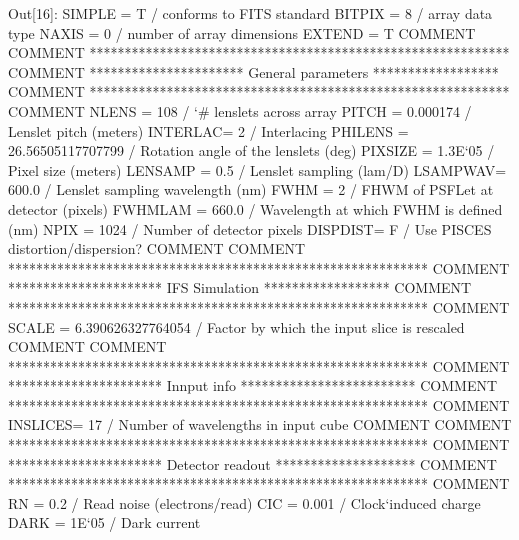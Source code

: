 \documentclass[letterpaper,10pt,english]{sphinxmanual}
\def\PYGZsh{\char`\#}
\def\PYGZhy{\char`\-}
\begin{document}
\begin{OriginalVerbatim}[commandchars=\\\{\}]
\textcolor{nbsphinxout}{Out[16]: }SIMPLE  =                    T / conforms to FITS standard
         BITPIX  =                    8 / array data type
         NAXIS   =                    0 / number of array dimensions
         EXTEND  =                    T
         COMMENT
         COMMENT ************************************************************
         COMMENT ********************** General parameters ******************
         COMMENT ************************************************************
         COMMENT
         NLENS   =                  108 / \PYGZsh{} lenslets across array
         PITCH   =             0.000174 / Lenslet pitch (meters)
         INTERLAC=                    2 / Interlacing
         PHILENS =    26.56505117707799 / Rotation angle of the lenslets (deg)
         PIXSIZE =              1.3E\PYGZhy{}05 / Pixel size (meters)
         LENSAMP =                  0.5 / Lenslet sampling (lam/D)
         LSAMPWAV=                600.0 / Lenslet sampling wavelength (nm)
         FWHM    =                    2 / FHWM of PSFLet at detector (pixels)
         FWHMLAM =                660.0 / Wavelength at which FWHM is defined (nm)
         NPIX    =                 1024 / Number of detector pixels
         DISPDIST=                    F / Use PISCES distortion/dispersion?
         COMMENT
         COMMENT ************************************************************
         COMMENT ********************** IFS Simulation ******************
         COMMENT ************************************************************
         COMMENT
         SCALE   =    6.390626327764054 / Factor by which the input slice is rescaled
         COMMENT
         COMMENT ************************************************************
         COMMENT ********************** Innput info *************************
         COMMENT ************************************************************
         COMMENT
         INSLICES=                   17 / Number of wavelengths in input cube
         COMMENT
         COMMENT ************************************************************
         COMMENT ********************** Detector readout ********************
         COMMENT ************************************************************
         COMMENT
         RN      =                  0.2 / Read noise (electrons/read)
         CIC     =                0.001 / Clock\PYGZhy{}induced charge
         DARK    =                1E\PYGZhy{}05 / Dark current

\end{OriginalVerbatim}
\end{document}
